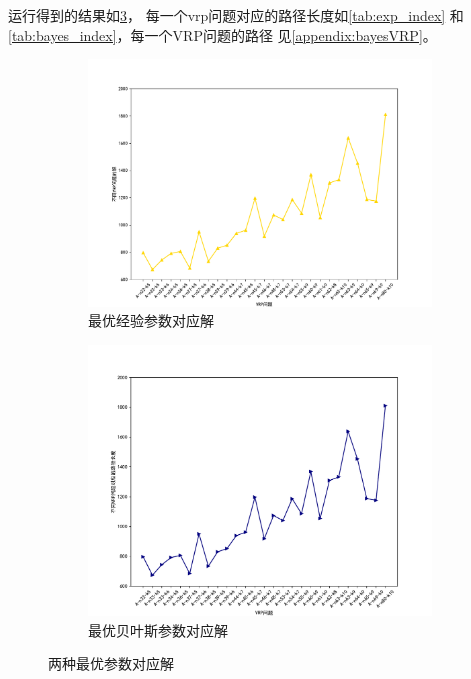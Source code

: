 \documentclass{nudt}
\begin{document}
运行得到的结果如\cref{fig:exp and bayes index}，
每一个vrp问题对应的路径长度如\cref{tab:exp_index}
和\cref{tab:bayes_index}，每一个VRP问题的路径
见\ref{appendix:bayesVRP}。

\begin{figure}[htbp]
	\centering
	\begin{subfigure}{0.467\linewidth}
		\centering
		\includegraphics[height=0.85\linewidth]{image/exp_best.pdf}
		\caption{最优经验参数对应解}
		\label{fig:exp_best}%
	\end{subfigure}
	\hspace*{17pt}
	\centering
	\begin{subfigure}{0.475\linewidth}
		\centering
		\includegraphics[height=0.85\linewidth]{image/bayes_best.pdf}
		\caption{最优贝叶斯参数对应解}
		\label{fig:bayes_best}%
	\end{subfigure}
	\caption{两种最优参数对应解}
	\label{fig:exp and bayes index}
\end{figure}
\end{document}
